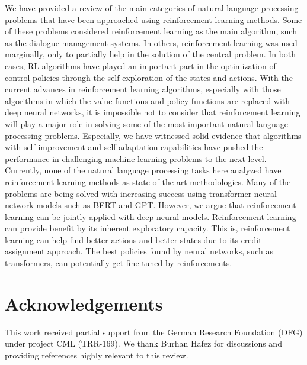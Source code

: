\label{conclusions}
We have provided a review of the main categories of natural language processing problems that have been approached using reinforcement learning methods. Some of these problems considered reinforcement learning as the main algorithm, such as the dialogue management
systems. In others, reinforcement learning was used marginally, only to partially help in the solution of the central problem. In both cases, RL algorithms have played an important part in the optimization of control policies through the self-exploration of the states and actions.
With the current advances in reinforcement learning algorithms, especially with those algorithms in which the value functions and policy functions are replaced with deep neural networks, it is impossible not to consider that reinforcement learning will play a major role in solving some of the most important natural language processing problems. Especially, we have witnessed solid evidence that algorithms with self-improvement and self-adaptation capabilities have pushed the performance in challenging machine learning problems to the next level.
Currently, none of the natural language processing tasks here analyzed have reinforcement learning methods as state-of-the-art methodologies. Many of the problems are being solved with increasing success using transformer neural network models such as BERT and GPT. However, we argue that reinforcement learning can be jointly applied with deep neural models. Reinforcement learning can  provide benefit by its inherent exploratory capacity. This is, reinforcement learning can help find better actions and better states due to its credit assignment  approach. The best policies found by neural networks, such as transformers, can potentially get fine-tuned by reinforcements.
\section*{Acknowledgements}
This work received partial support from the German Research Foundation (DFG) under project CML (TRR-169). We thank Burhan Hafez for discussions and providing references highly relevant to this review.
       
   

